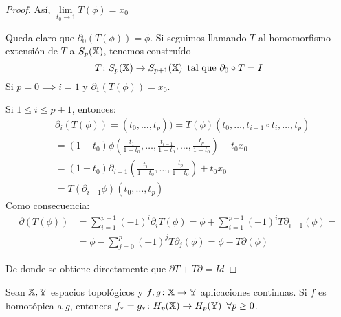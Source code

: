 \begin{proof}
  Así, $\lim\limits_{t_0 \to 1} T(\phi) = x_0$

  Queda claro que $\partial_0(T(\phi)) = \phi$. Si seguimos llamando $T$ al homomorfismo extensión de $T$ a $S_{p}({\mathbb X})$, tenemos construído
  \[  T \colon S_{p}({\mathbb X}) \to S_{p+1}({\mathbb X}) \hspace{0.5em} \text{tal que } \partial_0 \circ  T = I \]
  Si $p = 0 \implies i = 1$ y $\partial_1( T(\phi)) = x_0$.

  Si $1 \leq i \leq p+1$, entonces:
  \begin{align*}
    &\partial_i( T(\phi))=(t_0,\dots,t_p)) =  T(\phi)(t_0, \dots, t_{i-1} \circ t_i, \dots, t_p) \\
    &= (1-t_0)\phi(\frac{t_1}{1-t_0}, \dots, \frac{t_{i-1}}{1-t_0}, \dots, \frac{t_p}{1-t_0}) + t_0 x_0 \\
    &= (1-t_0)\partial_{i-1}(\frac{t_1}{1-t_0}, \dots, \frac{t_p}{1-t_0}) + t_0 x_0 \\
    &=  T(\partial_{i-1} \phi)(t_0, \dots, t_p)
  \end{align*}
  Como consecuencia:
  \begin{align*}
    \partial( T(\phi)) &= \sum\limits_{i = 1}^{p+1} (-1)^i \partial_i  T(\phi) =
    \phi + \sum\limits_{i = 1}^{p+1} (-1)^i  T \partial_{i-1}(\phi) = \\
    &= \phi - \sum\limits_{j = 0}^p (-1)^j  T \partial_j(\phi) = \phi -  T \partial(\phi)
  \end{align*}

  De donde se obtiene directamente que $\partial  T +  T \partial = Id$
\end{proof}

\begin{theorem}
  Sean ${\mathbb X}, {\mathbb Y}$ espacios topológicos y $f, g \colon {\mathbb X} \to {\mathbb Y}$ aplicaciones continuas. Si $f$ es homotópica a $g$,
  entonces $f_* = g_* \colon H_p({\mathbb X}) \to H_p({\mathbb Y}) \hspace{0.5em} \forall p \geq 0$.
\end{theorem}

